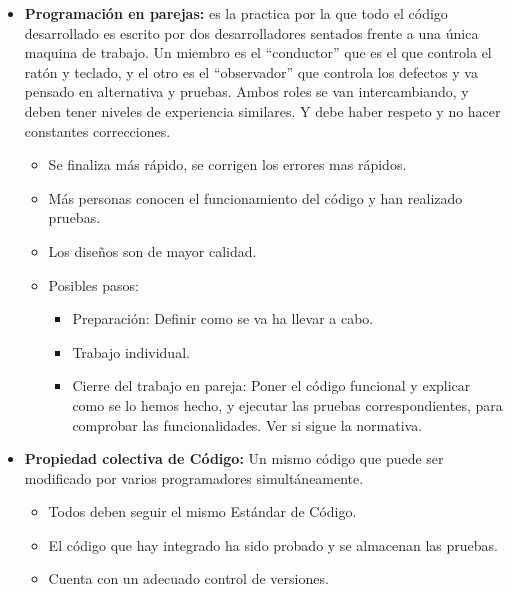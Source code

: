 \documentclass[12pt, twoside, openright]{report} %
\begin{document}
\begin{itemize}
\item \textbf{Programación en parejas:} es la practica por la que todo el
  código desarrollado es escrito por dos desarrolladores sentados frente
  a una única maquina de trabajo. Un miembro es el ``conductor'' que es
  el que controla el ratón y teclado, y el otro es el ``observador'' que
  controla los defectos y va pensado en alternativa y pruebas. Ambos
  roles se van intercambiando, y deben tener niveles de experiencia
  similares. Y debe haber respeto y no hacer constantes correcciones.
  

  \begin{itemize}
  \item Se finaliza más rápido, se corrigen los errores mas rápidos.
    
  \item Más personas conocen el funcionamiento del código y han realizado
    pruebas.
    
  \item Los diseños son de mayor calidad.
    
  \item Posibles pasos:
    

    \begin{itemize}
    \item Preparación: Definir como se va ha llevar a cabo.
      
    \item Trabajo individual.
      
    \item Cierre del trabajo en pareja: Poner el código funcional y explicar
      como se lo hemos hecho, y ejecutar las pruebas correspondientes,
      para comprobar las funcionalidades. Ver si sigue la normativa.
      
    \end{itemize}
  \end{itemize}
\item \textbf{Propiedad colectiva de Código:} Un mismo código que puede ser
  modificado por varios programadores simultáneamente.
  

  \begin{itemize}
  \item Todos deben seguir el mismo Estándar de Código.
    
  \item El código que hay integrado ha sido probado y se almacenan las
    pruebas.
    
  \item Cuenta con un adecuado control de versiones.
    

\end{itemize}
\end{itemize}
\end{document}
